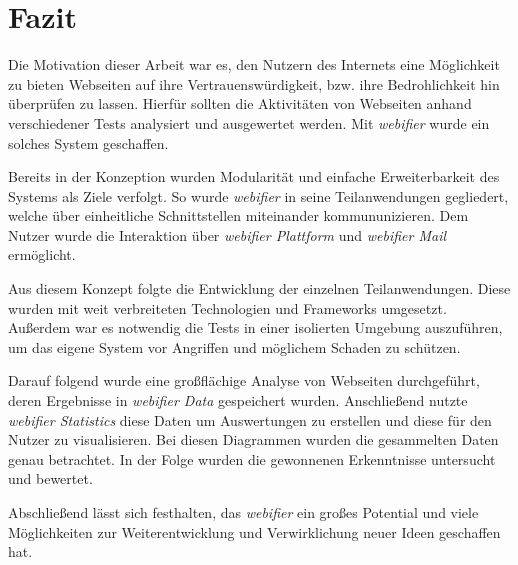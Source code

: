 \chapter{Fazit}

Die Motivation dieser Arbeit war es, den Nutzern des Internets eine Möglichkeit zu bieten Webseiten
auf ihre Vertrauenswürdigkeit, bzw. ihre Bedrohlichkeit hin überprüfen zu lassen. Hierfür sollten
die Aktivitäten von Webseiten anhand verschiedener Tests analysiert und ausgewertet werden. Mit
\textit{webifier} wurde ein solches System geschaffen.

Bereits in der Konzeption wurden Modularität und einfache Erweiterbarkeit des Systems als Ziele
verfolgt. So wurde \textit{webifier} in seine Teilanwendungen gegliedert, welche über einheitliche
Schnittstellen miteinander kommununizieren. Dem Nutzer wurde die Interaktion über \textit{webifier Plattform} und
\textit{webifier Mail} ermöglicht.

Aus diesem Konzept folgte die Entwicklung der einzelnen Teilanwendungen. Diese wurden mit weit
verbreiteten Technologien und Frameworks umgesetzt. Außerdem war es notwendig die Tests in einer
isolierten Umgebung auszuführen, um das eigene System vor Angriffen und möglichem Schaden zu
schützen.

Darauf folgend wurde eine großflächige Analyse von Webseiten durchgeführt, deren Ergebnisse in
\textit{webifier Data} gespeichert wurden. Anschließend nutzte \textit{webifier Statistics} diese Daten um
Auswertungen zu erstellen und diese für den Nutzer zu visualisieren. Bei diesen Diagrammen wurden
die gesammelten Daten genau betrachtet. In der Folge wurden die gewonnenen Erkenntnisse
untersucht und bewertet.

Abschließend lässt sich festhalten, das \textit{webifier} ein großes Potential und viele Möglichkeiten zur
Weiterentwicklung und Verwirklichung neuer Ideen geschaffen hat.